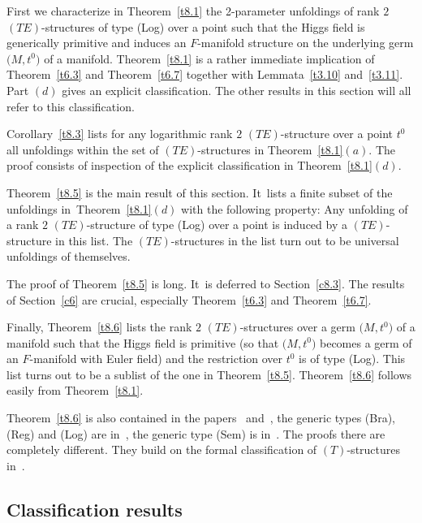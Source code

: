 \documentclass[pdftex]{sigma}%
\numberwithin{equation}{section}
\numberwithin{figure}{section}
\begin{document}
First we characterize in Theorem~\ref{t8.1}
the 2-parameter unfoldings of rank $2$
$(TE)$-structures of type (Log) over a point such that
the Higgs field is generically primitive
and induces an $F$-manifold structure on the underlying
germ $\big(M,t^0\big)$ of a manifold.
Theorem~\ref{t8.1} is a rather imme\-diate
implication of Theorem~\ref{t6.3} and Theorem~\ref{t6.7}
together with Lemmata~\ref{t3.10} and~\ref{t3.11}.
Part $(d)$ gives an explicit classification.
The other results in this section will all refer
to this classification.

Corollary~\ref{t8.3} lists for any logarithmic rank $2$
$(TE)$-structure over a point $t^0$ all unfoldings within
the set of $(TE)$-structures in Theorem~\ref{t8.1}$(a)$.
The proof consists of inspection of the explicit
classification in Theorem~\ref{t8.1}$(d)$.

Theorem~\ref{t8.5} is the main result of this section. It~lists a finite subset of the unfoldings in~Theo\-rem~\ref{t8.1}$(d)$ with the following property:
Any unfolding of a rank $2$ $(TE)$-structure of type (Log)
over a point is induced by a $(TE)$-structure in this list.
The $(TE)$-structures in the list turn out to be
universal unfoldings of themselves.

The proof of Theorem~\ref{t8.5} is long. It~is deferred
to Section~\ref{c8.3}. The results of Section~\ref{c6}
are crucial, especially Theorem~\ref{t6.3} and
Theorem~\ref{t6.7}.

Finally, Theorem~\ref{t8.6} lists the rank $2$
$(TE)$-structures over a germ $\big(M,t^0\big)$ of a manifold
such that the Higgs field is primitive (so that $\big(M,t^0\big)$
becomes a germ of an $F$-manifold with Euler field)
and the restriction over $t^0$ is of type (Log).
This list turns out to be a sublist of the one in
Theorem~\ref{t8.5}.
Theorem~\ref{t8.6} follows easily from Theorem~\ref{t8.1}.

Theorem~\ref{t8.6} is also contained in the papers~\cite{DH20-3}
 and~\cite{DH20-2}, the generic types (Bra), (Reg) and (Log)
are in~\cite{DH20-3}, the generic type (Sem)
is in~\cite{DH20-2}.
The proofs there are completely different. They build on the
formal classification of $(T)$-structures in~\cite{DH20-1}.

\subsection{Classification results}\label{c8.1}
\end{document}
